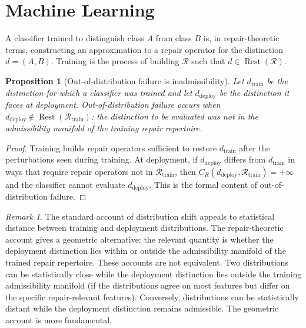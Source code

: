 \documentclass[12pt, oneside]{article}
\theoremstyle{plain}
\newtheorem{proposition}[theorem]{Proposition}
\theoremstyle{definition}
\theoremstyle{remark}
\newtheorem{remark}[theorem]{Remark}
\DeclareMathOperator{\Rest}{Rest}
\newcommand{\CR}{C_{\!R}}
\newcommand{\RestR}{\Rest(\mathcal{R})}
\begin{document}
\section{Machine Learning}
\label{sec:ml}

A classifier trained to distinguish class $A$ from class $B$ is,
in repair-theoretic terms, constructing an approximation to a repair
operator for the distinction $d = (A, B)$.
Training is the process of building $\mathcal{R}$ such that
$d \in \RestR$.

\begin{proposition}[Out-of-distribution failure is inadmissibility]
  Let $d_{\text{train}}$ be the distinction for which a classifier
  was trained and let $d_{\text{deploy}}$ be the distinction it
  faces at deployment.
  Out-of-distribution failure occurs when
  $d_{\text{deploy}} \notin \Rest(\mathcal{R}_{\text{train}})$:
  the distinction to be evaluated was not in the admissibility
  manifold of the training repair repertoire.
  \label{prop:ood}
\end{proposition}

\begin{proof}
  Training builds repair operators sufficient to restore
  $d_{\text{train}}$ after the perturbations seen during training.
  At deployment, if $d_{\text{deploy}}$ differs from
  $d_{\text{train}}$ in ways that require repair operators not
  in $\mathcal{R}_{\text{train}}$, then $\CR(d_{\text{deploy}},
  \mathcal{R}_{\text{train}}) = +\infty$ and the classifier
  cannot evaluate $d_{\text{deploy}}$.
  This is the formal content of out-of-distribution failure.
\end{proof}

\begin{remark}
  The standard account of distribution shift appeals to statistical
  distance between training and deployment distributions.
  The repair-theoretic account gives a geometric alternative: the
  relevant quantity is whether the deployment distinction lies
  within or outside the admissibility manifold of the trained
  repair repertoire.
  These accounts are not equivalent.
  Two distributions can be statistically close while the deployment
  distinction lies outside the training admissibility manifold
  (if the distributions agree on most features but differ on the
  specific repair-relevant features).
  Conversely, distributions can be statistically distant while the
  deployment distinction remains admissible.
  The geometric account is more fundamental.
\end{remark}
\end{document}
